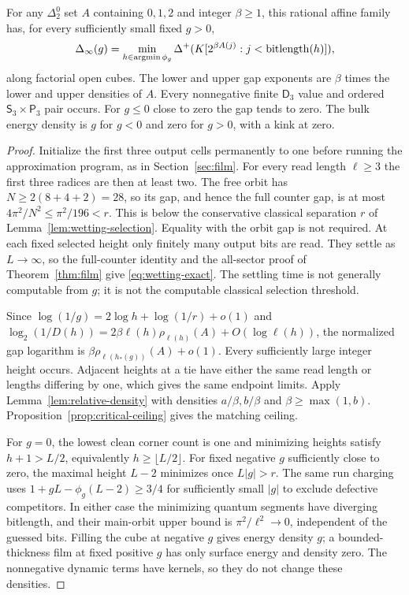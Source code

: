 \begin{theorem}\label{thm:wetting}
For any $\Delta^0_2$ set $A$ containing $0,1,2$ and integer
$\beta\geq1$, this rational
affine family has, for every sufficiently small fixed $g>0$,
\begin{equation}\label{eq:wetting-exact}
 \Delta_\infty(g)=
 \min_{h\in\operatorname*{argmin}\phi_g}
 \Delta^+(K[2^{\beta A(j)}:j<\operatorname{bitlength}(h)]),
\end{equation}
along factorial open cubes. The lower and upper gap exponents
are $\beta$ times the lower and upper densities of $A$.
Every nonnegative finite $\mathsf D_3$ value and ordered
$\mathsf S_3\times\mathsf P_3$ pair occurs. For $g\leq0$ close
to zero the gap tends to zero. The bulk energy density is $g$
for $g<0$ and zero for $g>0$, with a kink at zero.
\end{theorem}
\begin{proof}
Initialize the first three output cells permanently to one before
running the approximation program, as in Section~\ref{sec:film}.
For every read length $\ell\geq3$ the first three radices are then
at least two. The free orbit has $N\geq2(8+4+2)=28$, so its gap,
and hence the full counter gap, is at most
$4\pi^2/N^2\leq\pi^2/196<r$. This is below the conservative
classical separation $r$ of Lemma~\ref{lem:wetting-selection}.
Equality with the orbit gap is not required.
At each fixed selected height only finitely many output bits are
read. They settle as $L\to\infty$, so the full-counter identity
and the all-sector proof of Theorem~\ref{thm:film} give
\eqref{eq:wetting-exact}. The settling time is not generally
computable from $g$; it is not the computable classical selection
threshold.

Since $\log(1/g)=2\log h+\log(1/r)+o(1)$ and
$\log_2(1/D(h))=2\beta\ell(h)\rho_{\ell(h)}(A)+O(\log\ell(h))$,
the normalized gap logarithm is
$\beta\rho_{\ell(h_*(g))}(A)+o(1)$. Every sufficiently large
integer height occurs. Adjacent heights at a tie have either the
same read length or lengths differing by one, which gives the
same endpoint limits. Apply Lemma~\ref{lem:relative-density}
with densities $a/\beta,b/\beta$ and
$\beta\geq\max(1,b)$. Proposition~\ref{prop:critical-ceiling}
gives the matching ceiling.

For $g=0$, the lowest clean corner count is one and minimizing
heights satisfy $h+1>L/2$, equivalently $h\geq\lfloor L/2\rfloor$.
For fixed negative $g$ sufficiently
close to zero, the maximal height $L-2$ minimizes once
$L|g|>r$. The same run charging uses
$1+gL-\phi_g(L-2)\geq3/4$ for sufficiently small $|g|$ to
exclude defective competitors. In either case the minimizing
quantum segments have diverging bitlength, and their main-orbit
upper bound is $\pi^2/\ell^2\to0$, independent of the guessed
bits. Filling the cube at negative $g$ gives energy density $g$;
a bounded-thickness film at fixed positive $g$ has only surface
energy and density zero. The nonnegative dynamic terms have
kernels, so they do not change these densities.
\end{proof}

